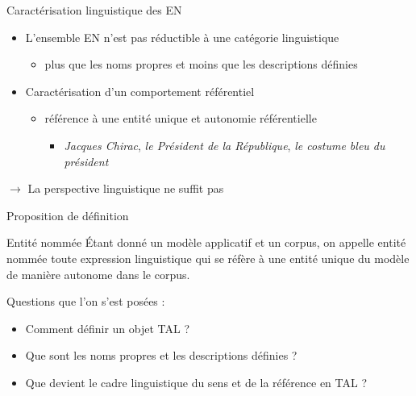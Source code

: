 \documentclass[xetex,xcolor={table,usenames,dvipsnames}]{beamer}
\begin{document}
\begin{frame}{Caractérisation linguistique des \textsc{EN}}
	\begin{itemize}
		\item L'ensemble \textsc{EN} n'est pas réductible à une catégorie linguistique
		\begin{itemize}
			\item plus que les noms propres et moins que les descriptions définies
			\end{itemize}
			\item Caractérisation d'un comportement référentiel
			\begin{itemize}
				\item référence à une entité unique et autonomie référentielle
				\begin{itemize}
					\item \textit{Jacques Chirac}, \textit{le Président de la République}, \textit{le costume bleu du président}
				\end{itemize}
			\end{itemize}
	\end{itemize}
	$\rightarrow$ \textcolor{deepred}{La perspective linguistique ne suffit pas}
\end{frame}

\begin{frame}{Proposition de définition}
	\begin{block}{Entité nommée}
		\justifying
		Étant donné un \textcolor{OliveGreen}{modèle applicatif} et un \textcolor{OliveGreen}{corpus}, on appelle entité nommée toute \textcolor{deepred}{expression linguistique} qui \textcolor{deepred}{se réfère} à une \textcolor{deepred}{entité unique} du modèle de manière \textcolor{deepred}{autonome} \textcolor{OliveGreen}{dans le corpus}.
	\end{block}
	
	Questions que l'on s'est posées : 
	\begin{itemize}
		\item Comment définir un objet \textsc{TAL} ?
		\item Que sont les noms propres et les descriptions définies ?
		\item Que devient le cadre linguistique du sens et de la référence en \textsc{TAL} ?
	\end{itemize}
\end{frame}
\end{document}
